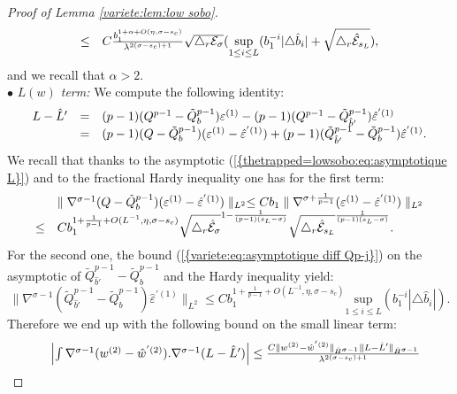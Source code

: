 \documentclass[11pt,a4paper,reqno]{amsart}
\theoremstyle{remark}
\numberwithin{equation}{section}
\begin{document}
\begin{proof}[Proof of Lemma \ref{variete:lem:low sobo}]
\begin{equation}
\begin{array}{r c l}
\leq &C \frac{b_1^{1+\alpha+O(\eta,\sigma-s_c)}}{\lambda^{2(\sigma-s_c)+1}}\sqrt{\triangle_r \mathcal{E}_{\sigma}} (\underset{1\leq i \leq L}{\text{sup}}(b_1^{-i}|\triangle \hat{b}_i|+\sqrt{\triangle_r \hat{\mathcal{E}}_{s_L}}), \\
\end{array}
\end{equation}
and we recall that $\alpha>2$.\\
$\bullet$ \emph{$L(w)$ term:} We compute the following identity:
$$
\begin{array}{r c l}
L-\hat{L}'&=&(p-1)(Q^{p-1}-\tilde{Q}_b^{p-1})\varepsilon^{(1)}-(p-1)(Q^{p-1}-\tilde{Q}_{\hat{b}'}^{p-1})\hat{\varepsilon}^{'(1)} \\
&=&(p-1)(Q-\tilde{Q}_b^{p-1})(\varepsilon^{(1)}-\hat{\varepsilon}^{'(1)})+(p-1)(\tilde{Q}_{\hat{b}'}^{p-1}-\tilde{Q}_b^{p-1})\hat{\varepsilon}^{'(1)}.
\end{array}
$$
We recall that thanks to the asymptotic {{\rm (\ref{{thetrapped=lowsobo:eq:asymptotique L}})}} and to the fractional Hardy inequality one has for the first term:
$$
\begin{array}{l l l l}
&\parallel \nabla^{\sigma-1}(Q-\tilde{Q}_b^{p-1})(\varepsilon^{(1)}-\hat{\varepsilon}^{'(1)})\parallel_{L^2}\leq Cb_1\parallel \nabla^{\sigma+\frac{1}{p-1}}(\varepsilon^{(1)}-\hat{\varepsilon}^{'(1)})  \parallel_{L^2}\\
\leq&Cb_1^{1+\frac{1}{p-1}+O(L^{-1},\eta,\sigma-s_c)}\sqrt{\triangle _r \hat{\mathcal{E}}_{\sigma}}^{1-\frac{1}{(p-1)(s_L-\sigma)}}\sqrt{\triangle _r \hat{\mathcal{E}}_{s_L}}^{\frac{1}{(p-1)(s_L-\sigma)}}.
\end{array}
$$
For the second one, the bound {{\rm (\ref{{variete:eq:asymptotique diff Qp-j}})}} on the asymptotic of $\tilde{Q}_{\hat{b}'}^{p-1}-\tilde{Q}_b^{p-1}$ and the Hardy inequality yield:
$$
\parallel \nabla^{\sigma-1}(\tilde{Q}_{\hat{b}'}^{p-1}-\tilde{Q}_b^{p-1})\hat{\varepsilon}^{'(1)} \parallel_{L^2}\leq Cb_1^{1+\frac{1}{p-1}+O(L^{-1},\eta,\sigma-s_c)}\underset{1\leq i \leq L}{\text{sup}}(b_1^{-i}|\triangle \hat{b}_i|).
$$
Therefore we end up with the following bound on the small linear term:
\begin{equation} \label{variete:lowsobo:eq:estimation L}
\begin{array}{r c l}
&\left| \int \nabla^{\sigma-1}(w^{(2)}-\hat{w}^{'(2)}).\nabla^{\sigma-1}(L-\hat{L}')\right|\leq \frac{C\parallel w^{(2)}-\hat{w}^{'(2)} \parallel_{\dot{H}^{\sigma-1}} \parallel L-\hat{L}' \parallel_{\dot{H}^{\sigma-1}}}{\lambda^{2(\sigma-s_c)+1}}  \\

\end{array}
\end{equation}
\end{proof}
\end{document}
